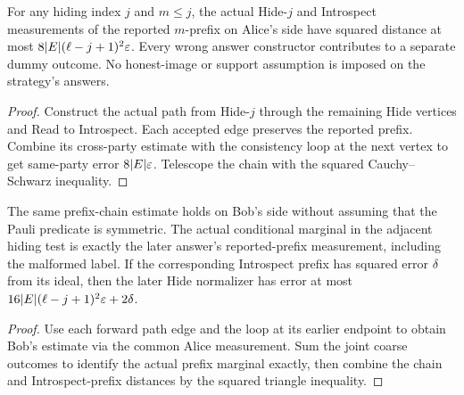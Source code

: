 \begin{lemma}
\label{lem:intro-actual-prefix-chain}
\leanok
For any hiding index $j$ and $m\leq j$, the actual Hide-$j$ and Introspect
measurements of the reported $m$-prefix on Alice's side have squared distance
at most $8|E|(\ell-j+1)^2\varepsilon$. Every wrong answer constructor contributes
to a separate dummy outcome. No honest-image or support assumption is
imposed on the strategy's answers.
\end{lemma}
\begin{proof}
\leanok
Construct the actual path from Hide-$j$ through the remaining Hide vertices
and Read to Introspect. Each accepted edge preserves the reported prefix.
Combine its cross-party estimate with the consistency loop at the next
vertex to get same-party error $8|E|\varepsilon$. Telescope the chain with the
squared Cauchy--Schwarz inequality.
\end{proof}

\begin{lemma}
\label{lem:intro-actual-normalizer-prefix}
\leanok
The same prefix-chain estimate holds on Bob's side without assuming that
the Pauli predicate is symmetric. The actual conditional marginal in the
adjacent hiding test is exactly the later answer's reported-prefix
measurement, including the malformed label. If the corresponding Introspect
prefix has squared error $\delta$ from its ideal, then the later Hide
normalizer has error at most
$16|E|(\ell-j+1)^2\varepsilon+2\delta$.
\end{lemma}
\begin{proof}
\leanok
Use each forward path edge and the loop at its earlier endpoint to obtain
Bob's estimate via the common Alice measurement. Sum the joint coarse
outcomes to identify the actual prefix marginal exactly, then combine the
chain and Introspect-prefix distances by the squared triangle inequality.
\end{proof}

